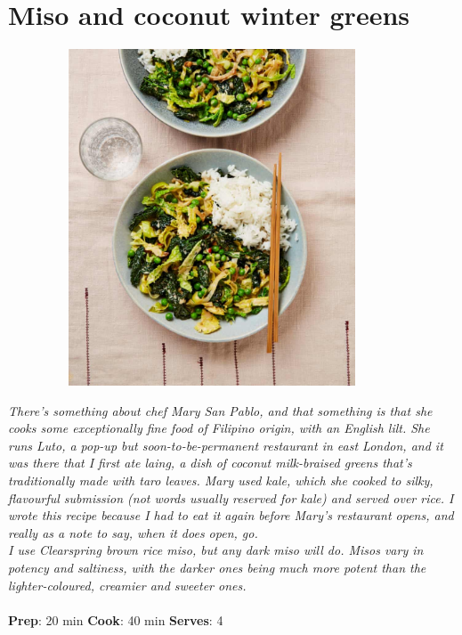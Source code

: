 \documentclass{book}
\begin{document}
\section{Miso and coconut winter greens}
\begin{figure}
\centering\includegraphics[width=10cm,height=10cm,keepaspectratio]{Recipe_Pictures/Miso_and_coconut_winter_greens.png}
\end{figure}
\emph{There’s something about chef Mary San Pablo, and that something is that she cooks some exceptionally fine food of Filipino origin, with an English lilt. She runs Luto, a pop-up but soon-to-be-permanent restaurant in east London, and it was there that I first ate laing, a dish of coconut milk-braised greens that’s traditionally made with taro leaves. Mary used kale, which she cooked to silky, flavourful submission (not words usually reserved for kale) and served over rice. I wrote this recipe because I had to eat it again before Mary’s restaurant opens, and really as a note to say, when it does open, go.\\ 
I use Clearspring brown rice miso, but any dark miso will do. Misos vary in potency and saltiness, with the darker ones being much more potent than the lighter-coloured, creamier and sweeter ones.}\\\\ 
\textbf{Prep}: 20 min
\textbf{Cook}: 40 min
\textbf{Serves}: 4
\end{document}
